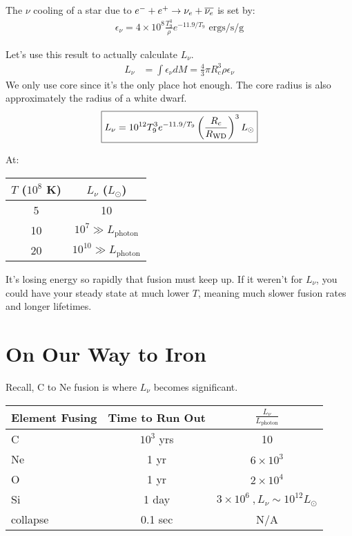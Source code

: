 The $\nu$ cooling of a star due to $e^- + e^+ \rightarrow \nu_e + \overline{\nu_e}$ is set by:
\begin{align}
\boxed{\epsilon_\nu = 4 \times 10^8 \frac{T_9^3}{\rho} e^{-11.9/T_9}\textrm{ ergs/s/g}}
\end{align}

\noindent Let's use this result to actually calculate $L_\nu$. 
\begin{align}
L_\nu &= \int \epsilon_\nu dM = \frac{4}{3}\pi R_c^3 \rho \epsilon_\nu
\end{align}
We only use core since it's the only place hot enough. The core radius is also approximately the radius of a white dwarf. 
\begin{align}
\boxed{L_\nu = 10^{12} T_9^3 e^{-11.9/T_9} \left( \frac{R_c}{R_{\textrm{WD}}} \right)^3 L_\odot}
\end{align}

At:
\begin{center}
\begin{tabular}{c|c}
\hline
 $T$ ($10^8$ K) &$L_\nu$ ($L_\odot$)\\ \hline
5   & 10\\ \hline
10 & $10^7  \gg L_{\textrm{photon}}$\\ \hline
20 & $10^{10}  \gg L_{\textrm{photon}}$\\
\hline
\end{tabular}
\end{center}

It's losing energy so rapidly that fusion must keep up. If it weren't for $L_\nu$, you could have your steady state at much lower $T$, meaning much slower fusion rates and longer lifetimes.

\section{On Our Way to Iron}

Recall, C to Ne fusion is where $L_\nu$ becomes significant.
\begin{center}
\begin{tabular}{l|c|c}
\hline
Element Fusing & Time to Run Out& $\frac{L_\nu}{L_{\textrm{photon}}}$ \\ \hline
C  	&$10^3$ yrs	&10\\ \hline
Ne	&1 yr 		&$ 6 \times 10^3$\\ \hline
O  	&1 yr		&$2 \times 10^4$\\ \hline
Si 	&1 day		&$3 \times 10^6~, L_\nu \sim 10^{12} L_\odot$\\ \hline
collapse& 0.1 sec 	& N/A \\ \hline
\end{tabular}
\end{center}

